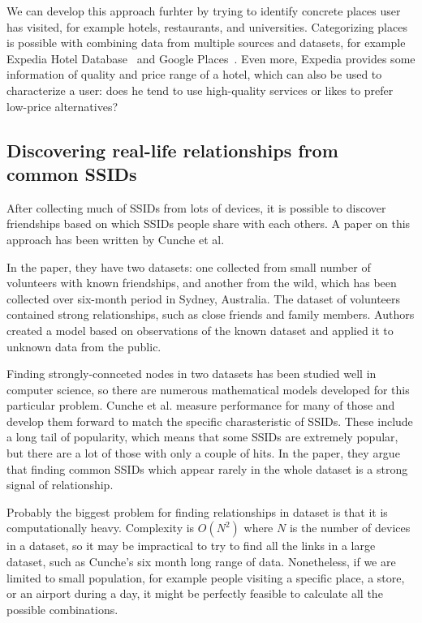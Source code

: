 \documentclass[12pt,a4paper,oneside,pdftex]{report}
\begin{document}
We can develop this approach furhter by trying to identify concrete places user has visited, for example hotels, restaurants, and universities. Categorizing places is possible with combining data from multiple sources and datasets, for example Expedia Hotel Database~\cite{expedia_hotel_db} and Google Places~\cite{google_places}. Even more, Expedia provides some information of quality and price range of a hotel, which can also be used to characterize a user: does he tend to use high-quality services or likes to prefer low-price alternatives?

\subsection{Discovering real-life relationships from common SSIDs}
\label{subsec:ssid_commons}

After collecting much of SSIDs from lots of devices, it is possible to discover friendships based on which SSIDs people share with each others. A paper on this approach has been written by Cunche et al.~\cite{cunche2014linking}

In the paper, they have two datasets: one collected from small number of volunteers with known friendships, and another from the wild, which has been collected over six-month period in Sydney, Australia. The dataset of volunteers contained strong relationships, such as close friends and family members. Authors created a model based on observations of the known dataset and applied it to unknown data from the public.

Finding strongly-connceted nodes in two datasets has been studied well in computer science, so there are numerous mathematical models developed for this particular problem. Cunche et al. measure performance for many of those and develop them forward to match the specific charasteristic of SSIDs. These include a long tail of popularity, which means that some SSIDs are extremely popular, but there are a lot of those with only a couple of hits. In the paper, they argue that finding common SSIDs which appear rarely in the whole dataset is a strong signal of relationship. 

Probably the biggest problem for finding relationships in dataset is that it is computationally heavy. Complexity is $O(N^2)$ where $N$ is the number of devices in a dataset, so it may be impractical to try to find all the links in a large dataset, such as Cunche's six month long range of data. Nonetheless, if we are limited to small population, for example people visiting a specific place, a store, or an airport during a day, it might be perfectly feasible to calculate all the possible combinations.
\end{document}
